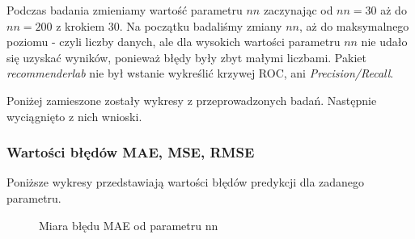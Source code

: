 \documentclass[12pt, a4paper]{article}
\begin{document}
Podczas badania zmieniamy wartość parametru $nn$ zaczynając od $nn=30$ aż do $nn=200$ z krokiem $30$. Na początku badaliśmy zmiany $nn$, aż do maksymalnego poziomu - czyli liczby danych, ale dla wysokich wartości parametru $nn$ nie udało się uzyskać wyników, ponieważ błędy były zbyt małymi liczbami. Pakiet \emph{recommenderlab} nie był wstanie wykreślić krzywej ROC, ani \emph{Precision/Recall}.

Poniżej zamieszone zostały wykresy z przeprowadzonych badań. Następnie wyciągnięto z nich wnioski.

\subsubsection{Wartości błędów MAE, MSE, RMSE}
Poniższe wykresy przedstawiają wartości błędów predykcji dla zadanego parametru.

\begin{figure}[H]
  \begin{center}
  \end{center}
  \caption{Miara błędu MAE od parametru nn}
  \label{fig:ubcf-nn-mae}
\end{figure}
\end{document}
